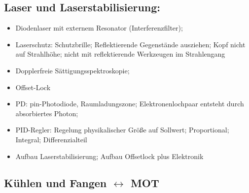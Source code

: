 \documentclass[10pt,a4paper]{extarticle}
\begin{document}
\subsection*{Laser und Laserstabilisierung:}
\begin{itemize}
\item Diodenlaser mit externem Resonator (Interferenzfilter);
\item Laserschutz: Schutzbrille; Reflektierende Gegenstände ausziehen; Kopf nicht auf Strahlhöhe; nicht mit reflektierende Werkzeugen im Strahlengang
\item Dopplerfreie Sättigungsspektroskopie;
\item Offset-Lock
\item PD: pin-Photodiode, Raumladungszone; Elektronenlochpaar entsteht durch absorbiertes Photon;
\item PID-Regler: Regelung physikalischer Größe auf Sollwert; Proportional; Integral; Differenzialteil
\item Aufbau Laserstabilisierung; Aufbau Offsetlock plus Elektronik
\end{itemize}


\subsection*{Kühlen und Fangen $\leftrightarrow$ MOT}
\end{document}
